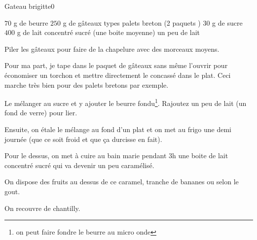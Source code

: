\begin{recette}{Gateau brigitte}{0}{}{}
\begin{ingredients}
\ingredient $70$ g de beurre
\ingredient $250$ g de gâteaux types palets breton (2 paquets )
\ingredient $30$ g de sucre
\ingredient $400$ g de lait concentré sucré (une boite moyenne)
\ingredient un peu de lait
\end{ingredients}

\begin{preparation}
\etape Piler les gâteaux pour faire de la chapelure avec des morceaux moyens.

\begin{remarque}
Pour ma part, je tape dans le paquet de gâteaux sans même l'ouvrir pour économiser un torchon et mettre directement le concassé dans le plat. Ceci marche très bien pour des palets bretons par exemple.
\end{remarque}

\etape Le mélanger au sucre et y ajouter le beurre fondu\footnote{on peut faire fondre le beurre au micro onde}. Rajoutez un peu de lait (un fond de verre) pour lier.

\etape Ensuite, on étale le mélange au fond d'un plat et on met au frigo une demi journée (que ce soit froid et que ça durcisse en fait).

\etape Pour le dessus, on met à cuire au bain marie pendant 3h une boite de lait concentré sucré qui va devenir un peu caramélisé.

\etape On dispose des fruits au dessus de ce caramel, tranche de bananes ou selon le gout.

\etape On recouvre de chantilly.
\end{preparation}

\end{recette}

